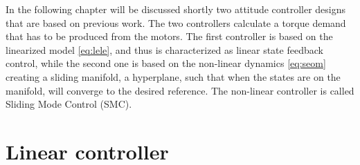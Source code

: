 In the following chapter will be discussed shortly two attitude controller designs that are based on previous work. The two controllers calculate a torque demand that has to be produced from the motors. The first controller is based on the linearized model \eqref{eq:lele}, and thus is characterized as linear state feedback control, while the second one is based on the non-linear dynamics \eqref{eq:seom} creating a sliding manifold, a hyperplane, such that when the states are on the manifold, will converge to the desired reference. The non-linear controller is called Sliding Mode Control (SMC).

\section{Linear controller}

